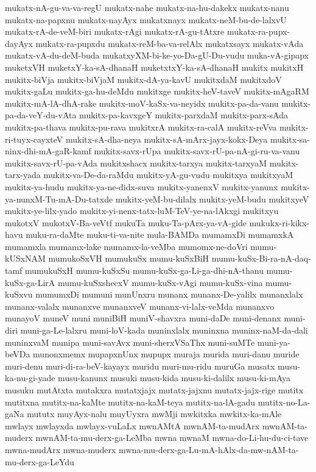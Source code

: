 {mukatx-nA-gu-va-va-regU
mukatx-nahe
mukatx-na-hu-dakekx
mukatx-nanu
mukatx-na-papxnu
mukatx-nayAyx
mukatxnayx
mukatx-neM-bu-de-lalxvU
mukatx-rA-de-veM-biri
mukatx-rAgi
mukatx-rA-gu-tAtxre
mukatx-ra-pupx-dayAyx
mukatx-ra-pupxdu
mukatx-reM-ba-va-relAlx
mukatxsayx
mukatx-vAda
mukatx-vA-du-deM-buda
mukatxyXM-bi-ke-yo-Da-gU-Du-vudu
muka-vA-gipapx
muketxVH
muketxY-ka-sA-dhanaH
muketxtxY-ka-sA-dhanaH
mukitx
mukitxH
mukitx-biVja
mukitx-biVjaM
mukitx-dA-ya-kavU
mukitxdaM
mukitxdoV
mukitx-gaLu
mukitx-ga-hu-deMdu
mukitxge
mukitx-heV-taveV
mukitx-mAgaRM
mukitx-mA-lA-dhA-rake
mukitx-moV-kaSx-va-neyidx
mukitx-pa-da-vanu
mukitx-pa-da-veY-du-vAta
mukitx-pa-kavxgeY
mukitx-parxdaM
mukitx-parx-sAda
mukitx-pa-thava
mukitx-pu-rava
mukitxrA
mukitx-ra-calA
mukitx-reVva
mukitx-ri-tuyx-cayxteV
mukitx-sA-dha-neya
mukitx-sA-mArx-jayx-kokx-Deya
mukitx-sa-ninx-dhi-mA-gaR-kamf
mukitx-savx-rUpa
mukitx-savx-rU-pa-nA-gi-ru-va-vanu
mukitx-savx-rU-pa-vAda
mukitxshacx
mukitx-tarxya
mukitx-tarxyaM
mukitx-tarx-yada
mukitx-va-De-da-raMdu
mukitx-yA-gu-vudu
mukitxya
mukitxyaM
mukitx-ya-hudu
mukitx-ya-ne-didx-suva
mukitx-yanenxV
mukitx-yanunx
mukitx-ya-nunxM-Tu-mA-Du-tatxde
mukitx-yeM-bu-dilalx
mukitx-yeM-budu
mukitxyeV
mukitx-ye-lilx-yado
mukitx-yi-nenx-tatx-luM-TeV-ye-na-lAkxgi
mukitxyu
mukotxV
mukotxV-Ba-veVtf
mukuTa
muku-Ta-pArx-ya-vA-gide
mukukx-ri-kikx-havu
muku-ra-daMte
muku-ti-va-nite
mula-BAMDa
mumamxDi
mumamxkA
mumamxla
mumamx-lake
mumamx-la-veMba
mumomx-ne-doVri
mumu-kUSxNAM
mumukoSxVH
mumukuSx
mumu-kuSxBiH
mumu-kuSx-Bi-ra-nA-daq-tamf
mumukuSxH
mumu-kuSxSu
mumu-kuSx-ga-Li-ga-dhi-nA-thanu
mumu-kuSx-ga-LirA
mumu-kuSxshecxV
mumu-kuSx-vAgi
mumu-kuSx-vina
mumu-kuSxvu
mumumxDi
mumuni
munUnxru
munanx
munanx-De-yalilx
munanxlalx
munanx-valalx
munanxve
munanxveV
munanx-vi-lalx-veMda
munanxvo
munayoV
muneV
muni
muniBiH
muniV-shavxra
muni-daDe
muni-denanx
muni-diri
muni-ga-Le-lalxru
muni-loV-kada
muninxlalx
muninxna
muninx-naM-da-dali
muninxvaM
munipa
muni-savAvx
muni-sherxVSaThx
muni-suMTe
muni-ya-beVDa
munonxmemx
mupapxnUnx
mupupx
muraja
murida
muri-danu
muride
muri-denu
muri-di-ra-beV-kayayx
muridu
muri-mu-ridu
muruGa
musatx
musu-ka-nu-gi-yade
musu-kanunx
musuki
musu-kida
musu-ki-dalilx
musu-ki-mAya
musuku
mutAtxta
mutakxra
mutatxjajx
mutatx-jajxnu
mutatx-jajx-rige
mutitx
mutitxna
mutitx-na-kaMte
mutitx-na-kaM-teya
mutitx-na-lA-gadu
mutitx-no-La-gaNa
mututx
muyAyx-nalu
muyUyxra
mwMji
mwkitxka
mwkitx-ka-mAle
mwlayx
mwlayxda
mwlayx-vuLaLx
mwnAMtA
mwnAM-ta-mudArx
mwnAM-ta-muderx
mwnAM-ta-mu-derx-ga-LeMba
mwna
mwnaM
mwna-do-Li-hu-du-ci-tave
mwna-mudArx
mwna-muderx
mwna-mu-derx-ga-Lu-mA-hAlx-da-mw-nAM-ta-mu-derx-ga-LeYdu
}
